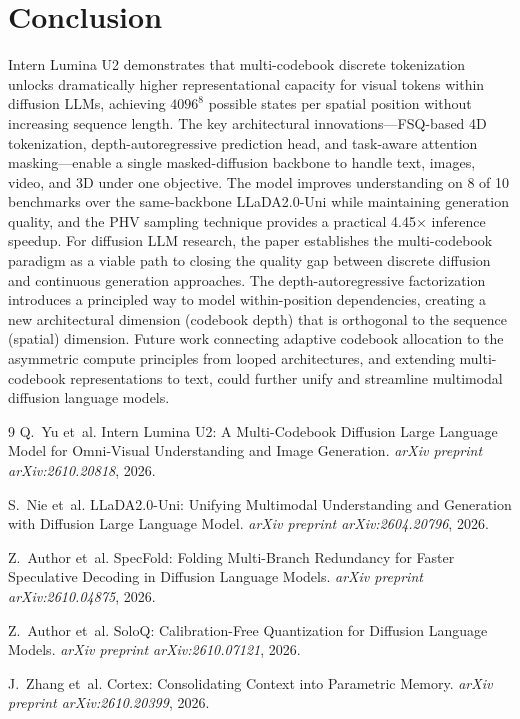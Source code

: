 \documentclass[11pt,a4paper]{article}
\begin{document}
\section{Conclusion}
Intern Lumina U2 demonstrates that multi-codebook discrete tokenization unlocks dramatically higher representational capacity for visual tokens within diffusion LLMs, achieving $4096^8$ possible states per spatial position without increasing sequence length. The key architectural innovations---FSQ-based 4D tokenization, depth-autoregressive prediction head, and task-aware attention masking---enable a single masked-diffusion backbone to handle text, images, video, and 3D under one objective. The model improves understanding on 8 of 10 benchmarks over the same-backbone LLaDA2.0-Uni while maintaining generation quality, and the PHV sampling technique provides a practical 4.45$\times$ inference speedup. For diffusion LLM research, the paper establishes the multi-codebook paradigm as a viable path to closing the quality gap between discrete diffusion and continuous generation approaches. The depth-autoregressive factorization introduces a principled way to model within-position dependencies, creating a new architectural dimension (codebook depth) that is orthogonal to the sequence (spatial) dimension. Future work connecting adaptive codebook allocation to the asymmetric compute principles from looped architectures, and extending multi-codebook representations to text, could further unify and streamline multimodal diffusion language models.

\begin{thebibliography}{9}
Q.~Yu et~al.
\newblock Intern Lumina U2: A Multi-Codebook Diffusion Large Language Model for Omni-Visual Understanding and Image Generation.
\newblock \emph{arXiv preprint arXiv:2610.20818}, 2026.

S.~Nie et~al.
\newblock LLaDA2.0-Uni: Unifying Multimodal Understanding and Generation with Diffusion Large Language Model.
\newblock \emph{arXiv preprint arXiv:2604.20796}, 2026.

Z.~Author et~al.
\newblock SpecFold: Folding Multi-Branch Redundancy for Faster Speculative Decoding in Diffusion Language Models.
\newblock \emph{arXiv preprint arXiv:2610.04875}, 2026.

Z.~Author et~al.
\newblock SoloQ: Calibration-Free Quantization for Diffusion Language Models.
\newblock \emph{arXiv preprint arXiv:2610.07121}, 2026.

J.~Zhang et~al.
\newblock Cortex: Consolidating Context into Parametric Memory.
\newblock \emph{arXiv preprint arXiv:2610.20399}, 2026.
\end{thebibliography}
\end{document}
